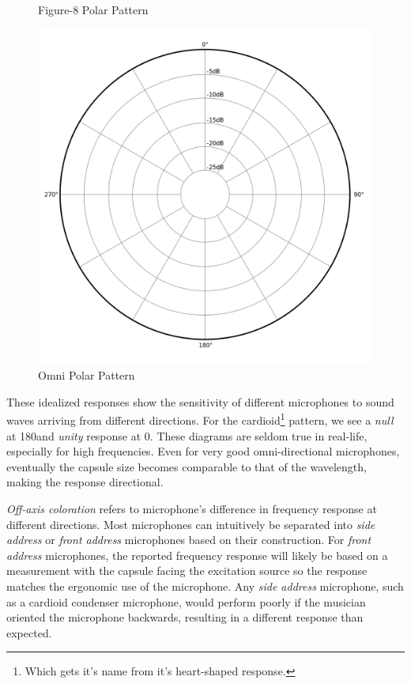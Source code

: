 \begin{figure}[!htb]
  \caption{Figure-8 Polar Pattern \cite{fig8_pic}}
  \label{fig:fig-8}
\endminipage\hfill
{}%
  \includegraphics[width=\linewidth]{img/omni.png}
  \caption{Omni Polar Pattern \cite{omni_pic}}
  \label{fig:omni}
\endminipage
\end{figure}

These idealized responses show the sensitivity of different microphones to sound waves arriving from different directions. For the cardioid\footnote{Which gets it's name from it's heart-shaped response.} pattern, we see a \textit{null} at 180\textdegree and \textit{unity} response at 0\textdegree. These diagrams are seldom true in real-life, especially for high frequencies. Even for very good omni-directional microphones, eventually the capsule size becomes comparable to that of the wavelength, making the response directional. 

\textit{Off-axis coloration} refers to microphone's difference in frequency response at different directions. Most microphones can intuitively be separated into \textit{side address} or \textit{front address} microphones based on their construction. For \textit{front address} microphones, the reported frequency response will likely be based on a measurement with the capsule facing the excitation source so the response matches the ergonomic use of the microphone. Any \textit{side address} microphone, such as a cardioid condenser microphone, would perform poorly if the musician oriented the microphone backwards, resulting in a different response than expected.

